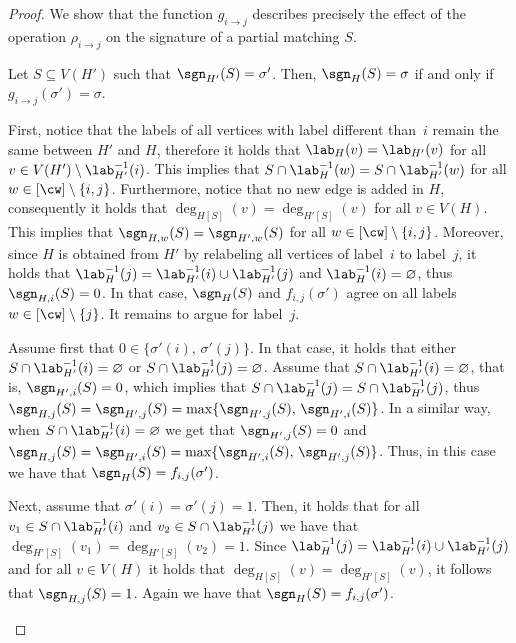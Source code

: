 \begin{proof}

    We show that the function $g_{i \to j}$ describes precisely the effect of the operation $\rho_{i \to j}$
    on the signature of a partial matching $S$.

    \begin{claim}\label{claim:induced:cw:relabel-correctness}
        Let $S \subseteq V(H')$ such that $\sgn_{H'}(S) = \sigma'$.
        Then, $\sgn_{H}(S) = \sigma$ if and only if $g_{i \to j}(\sigma') = \sigma$.
    \end{claim}


    \begin{claimproof}
        First, notice that the labels of all vertices with label different than~$i$ remain the same between $H'$ and $H$,
        therefore it holds that $\lab_H(v) = \lab_{H'}(v)$ for all $v \in V(H') \setminus \lab^{-1}_{H'}(i)$.
        This implies that $S \cap \lab^{-1}_H (w) = S \cap \lab^{-1}_{H'} (w)$ for all $w \in [\cw] \setminus \{i,j\}$.
        Furthermore, notice that no new edge is added in $H$, consequently it holds that $\deg_{H[S]}(v) = \deg_{H'[S]}(v)$ for all $v \in V(H)$.
        This implies that $\sgn_{H,w}(S) = \sgn_{H',w}(S)$ for all $w \in [\cw] \setminus \{i,j\}$.
        Moreover, since $H$ is obtained from $H'$ by relabeling all vertices of label~$i$ to label~$j$,
        it holds that $\lab^{-1}_H(j) = \lab^{-1}_{H'}(i) \cup \lab^{-1}_{H'}(j)$ and $\lab^{-1}_H(i) = \varnothing$,
        thus $\sgn_{H,i}(S) = 0$.
        In that case, $\sgn_{H}(S)$ and $f_{i,j}(\sigma')$ agree on all labels $w \in [\cw] \setminus \{j\}$.
        It remains to argue for label~$j$.

        Assume first that $0 \in \{\sigma'(i), \, \sigma'(j)\}$.
        In that case, it holds that either $S \cap \lab^{-1}_{H'}(i) = \varnothing$ or $S \cap \lab^{-1}_{H'}(j) = \varnothing$.
        Assume that $S \cap \lab^{-1}_{H'}(i) = \varnothing$, that is, $\sgn_{H',i}(S) = 0$,
        which implies that $S \cap \lab^{-1}_{H}(j) = S \cap \lab^{-1}_{H'}(j)$,
        thus $\sgn_{H,j}(S) = \sgn_{H',j}(S) = \max \{\sgn_{H',j}(S), \, \sgn_{H',i}(S)\}$.
        In a similar way, when $S \cap \lab^{-1}_{H'}(i) = \varnothing$ we get that $\sgn_{H',j}(S) = 0$
        and $\sgn_{H,j}(S) = \sgn_{H',i}(S) = \max \{\sgn_{H',i}(S), \, \sgn_{H',j}(S)\}$.
        Thus, in this case we have that $\sgn_{H}(S) = f_{i,j}(\sigma')$.

        Next, assume that $\sigma'(i) = \sigma'(j) = 1$.
        Then, it holds that for all $v_1 \in S \cap \lab^{-1}_{H'}(i)$ and $v_2 \in S \cap \lab^{-1}_{H'}(j)$
        we have that $\deg_{H'[S]} (v_1) = \deg_{H'[S]} (v_2) = 1$.
        Since $\lab^{-1}_H(j) = \lab^{-1}_{H'}(i) \cup \lab^{-1}_{H'}(j)$ and
        for all $v \in V(H)$ it holds that $\deg_{H[S]}(v) = \deg_{H'[S]}(v)$,
        it follows that $\sgn_{H,j}(S) = 1$.
        Again we have that $\sgn_{H}(S) = f_{i,j}(\sigma')$.


\end{claimproof}
\end{proof}
